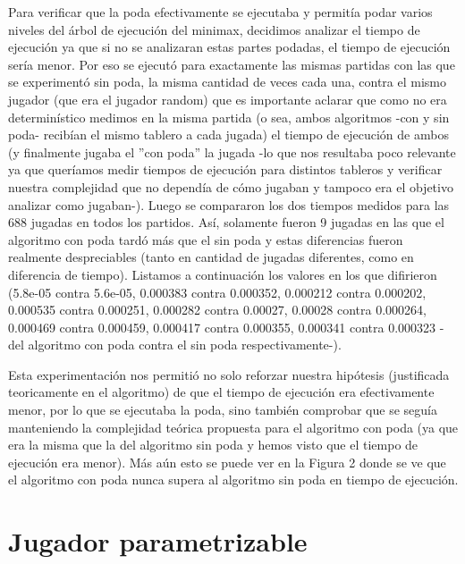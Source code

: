 \documentclass[A4paper,oneside,fleqn,11pt]{article}
\theoremstyle{definition}
\begin{document}
Para verificar que la poda efectivamente se ejecutaba y permitía podar varios niveles del árbol de ejecución del minimax, decidimos analizar el tiempo de ejecución ya que si no se analizaran estas partes podadas, el tiempo de ejecución sería menor. Por eso se ejecutó para exactamente las mismas partidas con las que se experimentó sin poda, la misma cantidad de veces cada una, contra el mismo jugador (que era el jugador random) que es importante aclarar que como no era determinístico medimos en la misma partida (o sea, ambos algoritmos -con y sin poda- recibían el mismo tablero a cada jugada) el tiempo de ejecución de ambos (y finalmente jugaba el ''con poda'' la jugada -lo que nos resultaba poco relevante ya que queríamos medir tiempos de ejecución para distintos tableros y verificar nuestra complejidad que no dependía de cómo jugaban y tampoco era el objetivo analizar como jugaban-). Luego se compararon los dos tiempos medidos para las 688 jugadas en todos los partidos. Así, solamente fueron 9 jugadas en las que el algoritmo con poda tardó más que el sin poda y estas diferencias fueron realmente despreciables (tanto en cantidad de jugadas diferentes, como en diferencia de tiempo). Listamos a continuación los valores en los que difirieron (5.8e-05 contra 5.6e-05, 0.000383 contra 0.000352, 0.000212 contra 0.000202, 0.000535 contra 0.000251, 0.000282 contra 0.00027, 0.00028 contra 0.000264, 0.000469 contra 0.000459, 0.000417 contra 0.000355, 0.000341 contra 0.000323 -del algoritmo con poda contra el sin poda respectivamente-).

Esta experimentación nos permitió no solo reforzar nuestra hipótesis (justificada teoricamente en el algoritmo) de que el tiempo de ejecución era efectivamente menor, por lo que se ejecutaba la poda, sino también comprobar que se seguía manteniendo la complejidad teórica propuesta para el algoritmo con poda (ya que era la misma que la del algoritmo sin poda y hemos visto que el tiempo de ejecución era menor). Más aún esto se puede ver en la Figura 2 donde se ve que el algoritmo con poda nunca supera al algoritmo sin poda en tiempo de ejecución.



















\section{Jugador parametrizable}
\end{document}
